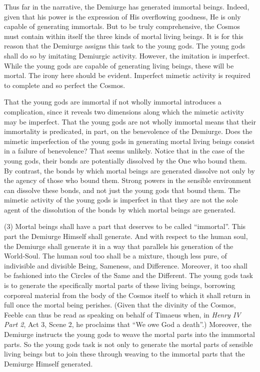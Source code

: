 Thus far in the narrative, the Demiurge has generated immortal beings. Indeed, given that his power is the expression of His overflowing goodness, He is only capable of generating immortals. But to be truly comprehensive, the Cosmos must contain within itself the three kinds of mortal living beings. It is for this reason that the Demiurge assigns this task to the young gods. The young gods shall do so by imitating Demiurgic activity. However, the imitation is imperfect. While the young gods are capable of generating living beings, these will be mortal. The irony here should be evident. Imperfect mimetic activity is required to complete and so perfect the Cosmos.

That the young gods are immortal if not wholly immortal introduces a complication, since it reveals two dimensions along which the mimetic activity may be imperfect. That the young gods are not wholly immortal means that their immortality is predicated, in part, on the benevolence of the Demiurge. Does the mimetic imperfection of the young gods in generating mortal living beings consist in a failure of benevolence? That seems unlikely. Notice that in the case of the young gods, their bonds are potentially dissolved by the One who bound them. By contrast, the bonds by which mortal beings are generated dissolve not only by the agency of those who bound them. Strong powers in the sensible environment can dissolve these bonds, and not just the young gods that bound them. The mimetic activity of the young gods is imperfect in that they are not the sole agent of the dissolution of the bonds by which mortal beings are generated.

(3) Mortal beings shall have a part that deserves to be called ``immortal''. This part the Demiurge Himself shall generate. And with respect to the human soul, the Demiurge shall generate it in a way that parallels his generation of the World-Soul. The human soul too shall be a mixture, though less pure, of indivisible and divisible Being, Sameness, and Difference. Moreover, it too shall be fashioned into the Circles of the Same and the Different. The young gods task is to generate the specifically mortal parts of these living beings, borrowing corporeal material from the body of the Cosmos itself to which it shall return in full once the mortal being perishes. (Given that the divinity of the Cosmos, Feeble can thus be read as speaking on behalf of Timaeus when, in \emph{Henry IV Part 2}, Act 3, Scene 2, he proclaims that ``We owe God a death''.) Moreover, the Demiurge instructs the young gods to weave the mortal parts into the immmortal parts. So the young gods task is not only to generate the mortal parts of sensible living beings but to join these through weaving to the immortal parts that the Demiurge Himself generated.

